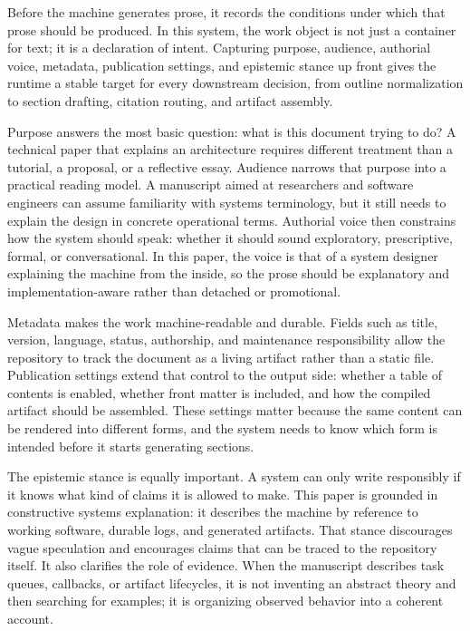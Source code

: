 Before the machine generates prose, it records the conditions under which that prose should be produced. In this system, the work object is not just a container for text; it is a declaration of intent. Capturing purpose, audience, authorial voice, metadata, publication settings, and epistemic stance up front gives the runtime a stable target for every downstream decision, from outline normalization to section drafting, citation routing, and artifact assembly.

Purpose answers the most basic question: what is this document trying to do? A technical paper that explains an architecture requires different treatment than a tutorial, a proposal, or a reflective essay. Audience narrows that purpose into a practical reading model. A manuscript aimed at researchers and software engineers can assume familiarity with systems terminology, but it still needs to explain the design in concrete operational terms. Authorial voice then constrains how the system should speak: whether it should sound exploratory, prescriptive, formal, or conversational. In this paper, the voice is that of a system designer explaining the machine from the inside, so the prose should be explanatory and implementation-aware rather than detached or promotional.

Metadata makes the work machine-readable and durable. Fields such as title, version, language, status, authorship, and maintenance responsibility allow the repository to track the document as a living artifact rather than a static file. Publication settings extend that control to the output side: whether a table of contents is enabled, whether front matter is included, and how the compiled artifact should be assembled. These settings matter because the same content can be rendered into different forms, and the system needs to know which form is intended before it starts generating sections.

The epistemic stance is equally important. A system can only write responsibly if it knows what kind of claims it is allowed to make. This paper is grounded in constructive systems explanation: it describes the machine by reference to working software, durable logs, and generated artifacts. That stance discourages vague speculation and encourages claims that can be traced to the repository itself. It also clarifies the role of evidence. When the manuscript describes task queues, callbacks, or artifact lifecycles, it is not inventing an abstract theory and then searching for examples; it is organizing observed behavior into a coherent account.

